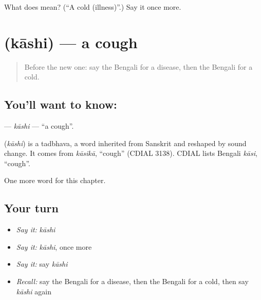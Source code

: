 \begin{tcolorbox}[breakable,colback=teal!4,colframe=teal!35!black,title={Before you move on}]
What does  mean? (\textquotedblleft{}A cold (illness)\textquotedblright{}.) Say it once more.
\end{tcolorbox}
\section[\texorpdfstring{\bn{কাশি} (kāshi)}{কাশি (kāshi)}]{ (kāshi) — a cough}

\label{lesson:BN-C154-kashi}



\begin{quote}
Before the new one: say the Bengali for a disease, then the Bengali for a cold.
\end{quote}

\subsection*{You'll want to know: }
\textbf{} — \emph{kāshi} — \textquotedblleft{}a cough\textquotedblright{}.

\begin{cousinweb}
\textbf{} (\emph{kāshi}) is a tadbhava, a word inherited from Sanskrit and reshaped by sound change. It comes from \emph{kāsikā}, \textquotedblleft{}cough\textquotedblright{} (CDIAL 3138). CDIAL lists Bengali \emph{kāsi}, \textquotedblleft{}cough\textquotedblright{}.
\end{cousinweb}

\begin{grammarlens}[title={What you've built}]
One more word for this chapter.
\end{grammarlens}

\subsection*{Your turn}
\begin{itemize}
\raggedright
  \item \emph{Say it:} \emph{kāshi}
  \item \emph{Say it:} \emph{kāshi}, once more
  \item \emph{Say it:} say \emph{kāshi}
  \item \emph{Recall:} say the Bengali for a disease, then the Bengali for a cold, then say \emph{kāshi} again
\end{itemize}

